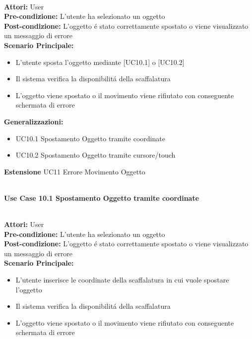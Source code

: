 \vspace{0.5cm}

\large\textbf{} \\
\textbf{Attori:} User\\
\textbf{Pre-condizione:} L'utente ha selezionato un oggetto \\
\textbf{Post-condizione: } L'oggetto é stato correttamente spostato o viene visualizzato un messaggio di errore\\
\textbf{Scenario Principale:} 
\begin{itemize}
    \item L'utente sposta l'oggetto mediante [UC10.1] o [UC10.2]
    \item Il sistema verifica la disponibilitá della scaffalatura
    \item L'oggetto viene spostato o il movimento viene rifiutato con conseguente schermata di errore
\end{itemize}
\textbf{Generalizzazioni:}
\begin{itemize}
    \item UC10.1 Spostamento Oggetto tramite coordinate
    \item UC10.2 Spostamento Oggetto tramite cursore/touch
\end{itemize}
\textbf{Estensione} UC11 Errore Movimento Oggetto

\vspace{0.5cm}

\Large\textbf{}\\
\Large\textbf{Use Case 10.1 Spostamento Oggetto tramite coordinate} \\

\vspace{0.5cm}

\large\textbf{} \\
\textbf{Attori:} User\\
\textbf{Pre-condizione:} L'utente ha selezionato un oggetto \\
\textbf{Post-condizione: } L'oggetto é stato correttamente spostato o viene visualizzato un messaggio di errore\\
\textbf{Scenario Principale:} 
\begin{itemize}
    \item L'utente inserisce le coordinate della scaffalatura in cui vuole spostare l'oggetto
    \item Il sistema verifica la disponibilitá della scaffalatura
    \item L'oggetto viene spostato o il movimento viene rifiutato con conseguente schermata di errore
\end{itemize}

